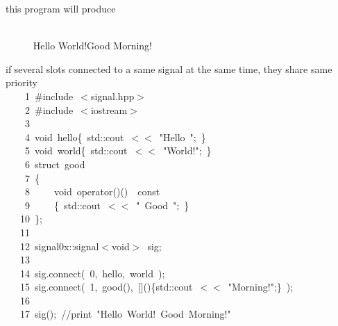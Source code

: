 \documentclass[9pt,onside,a4paper]{article}
\newcommand{\hlstd}[1]{\textcolor[rgb]{0.2,0,0.4}{#1}}
\newcommand{\hlnum}[1]{\textcolor[rgb]{0.2,0.73,0.02}{#1}}
\newcommand{\hlstr}[1]{\textcolor[rgb]{0.09,0.38,0.65}{#1}}
\newcommand{\hlslc}[1]{\textcolor[rgb]{0,0.4,0.2}{#1}}
\newcommand{\hlppc}[1]{\textcolor[rgb]{0.33,0.45,0.69}{#1}}
\newcommand{\hlopt}[1]{\textcolor[rgb]{0.33,0.33,0.33}{#1}}
\newcommand{\hllin}[1]{\textcolor[rgb]{0.6,0.6,0.6}{#1}}
\newcommand{\hlkwb}[1]{\textcolor[rgb]{0.96,0.55,0.14}{#1}}
\newcommand{\hlkwc}[1]{\textcolor[rgb]{0,0,1}{#1}}
\newcommand{\hlkwd}[1]{\textcolor[rgb]{0.82,0.11,0.93}{#1}}
\begin{document}
this program will produce
\begin{shaded}
{\small
\ttfamily
~\\
\hllin{\ \ \ \ \ }         Hello World!Good Morning! \\
\normalfont
}
\end{shaded}


if several slots connected to a same signal at the same time, they share same priority \\

\noindent
\ttfamily
\hlstd{}\hllin{\ \ \ \ 1\ }\hlppc{\#include\ $<$signal.hpp$>$}\\
\hllin{\ \ \ \ 2\ }\hlstd{}\hlppc{\#include\ $<$iostream$>$}\\
\hllin{\ \ \ \ 3\ }\hlstd{}\\
\hllin{\ \ \ \ 4\ }\hlkwb{void\ }\hlstd{hello}\hlopt{\{\ }\hlstd{std}\hlopt{::}\hlstd{cout\ }\hlopt{$<$$<$\ }\hlstd{}\hlstr{"Hello\ "}\hlstd{}\hlopt{;\ \}}\\
\hllin{\ \ \ \ 5\ }\hlstd{}\hlkwb{void\ }\hlstd{world}\hlopt{\{\ }\hlstd{std}\hlopt{::}\hlstd{cout\ }\hlopt{$<$$<$\ }\hlstd{}\hlstr{"World!"}\hlstd{}\hlopt{;\ \}}\\
\hllin{\ \ \ \ 6\ }\hlstd{}\hlkwb{struct\ }\hlstd{good}\\
\hllin{\ \ \ \ 7\ }\hlopt{\{}\\
\hllin{\ \ \ \ 8\ }\hlstd{}\hlstd{\ \ \ \ }\hlstd{}\hlkwb{void\ }\hlstd{}\hlkwc{operator}\hlstd{}\hlopt{()()}\hlstd{\ \ }\hlopt{}\hlstd{}\hlkwb{const}\\
\hllin{\ \ \ \ 9\ }\hlstd{}\hlstd{\ \ \ \ }\hlstd{}\hlopt{\{\ }\hlstd{std}\hlopt{::}\hlstd{cout\ }\hlopt{$<$$<$\ }\hlstd{}\hlstr{"\ Good\ "}\hlstd{}\hlopt{;\ \}}\\
\hllin{\ \ \ 10\ }\hlstd{}\hlopt{\};}\\
\hllin{\ \ \ 11\ }\hlstd{\\
\hllin{\ \ \ 12\ }signal0x}\hlopt{::}\hlstd{signal}\hlopt{$<$}\hlstd{}\hlkwb{void}\hlstd{}\hlopt{$>$\ }\hlstd{sig}\hlopt{;}\\
\hllin{\ \ \ 13\ }\hlstd{\\
\hllin{\ \ \ 14\ }sig}\hlopt{.}\hlstd{}\hlkwd{connect}\hlstd{}\hlopt{(\ }\hlstd{}\hlnum{0}\hlstd{}\hlopt{,\ }\hlstd{hello}\hlopt{,\ }\hlstd{world\ }\hlopt{);}\\
\hllin{\ \ \ 15\ }\hlstd{sig}\hlopt{.}\hlstd{}\hlkwd{connect}\hlstd{}\hlopt{(\ }\hlstd{}\hlnum{1}\hlstd{}\hlopt{,\ }\hlstd{good}\hlopt{(),\ {[}{]}()\{}\hlstd{std}\hlopt{::}\hlstd{cout\ }\hlopt{$<$$<$\ }\hlstd{}\hlstr{"Morning!"}\hlstd{}\hlopt{;\}\ );}\\
\hllin{\ \ \ 16\ }\hlstd{}\\
\hllin{\ \ \ 17\ }\hlkwd{sig}\hlstd{}\hlopt{();\ }\hlstd{}\hlslc{//print\ "Hello\ World!\ Good\ Morning!"}\hlstd{}\\
\mbox{}
\normalfont
\normalsize
\end{document}

